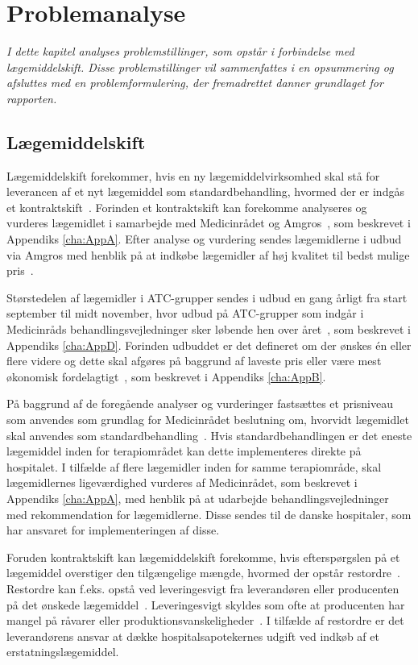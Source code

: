 \chapter{Problemanalyse}
\textit{I dette kapitel analyses problemstillinger, som opstår i forbindelse med lægemiddelskift. Disse problemstillinger vil sammenfattes i en opsummering og afsluttes med en problemformulering, der fremadrettet danner  grundlaget for rapporten.}

\section{Lægemiddelskift}
Lægemiddelskift forekommer, hvis en ny lægemiddelvirksomhed skal stå for leverancen af et nyt lægemiddel som standardbehandling, hvormed der er indgås et kontraktskift~\citep{Amgros2015}. Forinden et kontraktskift kan forekomme analyseres og vurderes lægemidlet i samarbejde med Medicinrådet og Amgros~\citep{DanskeRegioner2016}, som beskrevet i Appendiks \ref{cha:AppA}. Efter analyse og vurdering sendes lægemidlerne i udbud  via Amgros med henblik på at indkøbe lægemidler af høj kvalitet til bedst mulige pris~\citep{Sygehusapoteket2017}.

Størstedelen af lægemidler i ATC-grupper sendes i udbud en gang årligt fra start september til midt november, hvor udbud på ATC-grupper som indgår i Medicinråds behandlingsvejledninger sker løbende hen over året~\citep{Sygehusapoteket2017}, som beskrevet i Appendiks \ref{cha:AppD}.
Forinden udbuddet er det defineret om der ønskes én eller flere videre og dette skal afgøres på baggrund af laveste pris eller være mest økonomisk fordelagtigt~\citep{Amgros2018a}, som beskrevet i Appendiks \ref{cha:AppB}.

På baggrund af de foregående analyser og vurderinger fastsættes et prisniveau som anvendes som grundlag for Medicinrådet beslutning om, hvorvidt lægemidlet skal anvendes som standardbehandling~\citep{DanskeRegioner2016}. Hvis standardbehandlingen er det eneste lægemiddel inden for terapiområdet kan dette implementeres direkte på hospitalet. I tilfælde af flere lægemidler inden for samme terapiområde, skal lægemidlernes ligeværdighed vurderes af Medicinrådet, som beskrevet i Appendiks \ref{cha:AppA}, med henblik på at udarbejde behandlingsvejledninger med rekommendation for lægemidlerne. Disse sendes til de danske hospitaler, som har ansvaret for implementeringen af disse.~\citep{DanskeRegioner2016}

Foruden kontraktskift kan lægemiddelskift forekomme, hvis efterspørgslen på et lægemiddel overstiger den tilgængelige mængde, hvormed der opstår restordre~\citep{Amgros2015}. Restordre kan f.eks. opstå ved leveringesvigt fra leverandøren eller producenten på det ønskede lægemiddel~\citep{Amgros2017, Laegemiddelinformaion2017}. Leveringesvigt skyldes som ofte at producenten har mangel på råvarer eller produktionsvanskeligheder~\citep{Amgros2017, Laegemiddelinformaion2017}. I tilfælde  af restordre er det leverandørens ansvar at dække hospitalsapotekernes udgift ved indkøb af et erstatningslægemiddel\citep{Laegemiddelinformaion2017, Amgros2017}.

